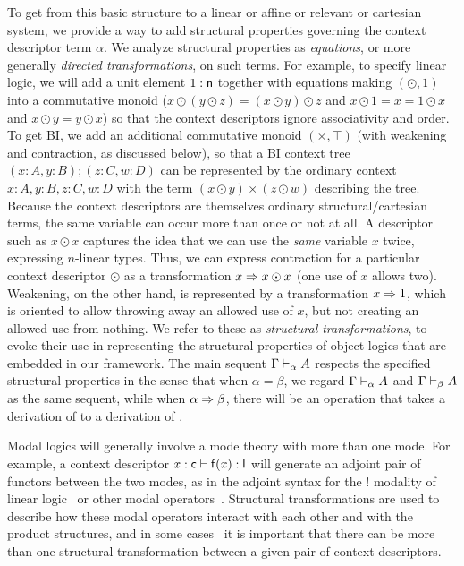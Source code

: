 To get from this basic structure to a linear or affine or relevant or
cartesian system, we provide a way to add structural properties governing
the context descriptor term $\alpha$.  We analyze structural properties
as \emph{equations}, or more generally \emph{directed transformations},
on such terms.  For example, to specify linear logic, we will add a unit
element $1 : \mathsf{n}$ together with equations making $(\odot,1)$ into a
commutative monoid ($x \odot (y \odot z) = (x \odot y) \odot z$ and 
$x \odot 1 = x = 1 \odot x$ and 
$x \odot y = y \odot x$)
so that the context descriptors ignore associativity and order.  To get
BI, we add an additional commutative monoid $(\times,\top)$ (with
weakening and contraction, as discussed below), so that a BI context
tree $(x:A,y:B);(z:C,w:D)$ can be represented by the ordinary context
$x:A,y:B,z:C,w:D$ with the term $(x \odot y) \times (z \odot w)$
describing the tree.  Because the context descriptors are themselves
ordinary structural/cartesian terms, the same variable can occur more
than once or not at all.  A descriptor such as $x \odot x$ captures the
idea that we can use the \emph{same} variable $x$ twice, expressing
$n$-linear types.  Thus, we can express contraction for a particular
context descriptor $\odot$ as a transformation $x \Rightarrow x \odot x$ (one
use of $x$ allows two).  Weakening, on the other hand, is represented by
a transformation $x \Rightarrow 1$, which is oriented to allow throwing away an
allowed use of $x$, but not creating an allowed use from nothing.  We
refer to these as \emph{structural transformations}, to evoke their use
in representing the structural properties of object logics that are
embedded in our framework.  The main sequent $\Gamma \vdash_{\alpha} A$
respects the specified structural properties in the sense that when
$\alpha = \beta$, we regard $\Gamma \vdash_{\alpha} A$ and
$\Gamma \vdash_{\beta} A$ as the same sequent, while when $\alpha \Rightarrow
\beta$, there will be an operation that takes a derivation of
 to a derivation of .

Modal logics will generally involve a mode theory with more than one
mode.  For example, a context descriptor $x : \mathsf{c} \vdash \mathsf{f}(x)
: \mathsf{l}$ will generate an adjoint pair of functors between the two
modes, as in the adjoint syntax for the $!$ modality of linear
logic~\citep{bentonwadler96adjoint} or other modal
operators~\citep{reed09adjoint}.  Structural transformations are used to
describe how these modal operators interact with each other and with the
product structures, and in some cases~\citep{ls16adjoint} it is
important that there can be more than one structural transformation
between a given pair of context descriptors.

